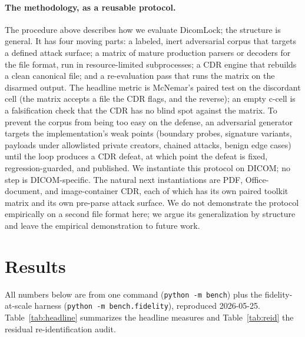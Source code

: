 \documentclass[11pt]{article}
\begin{document}
\paragraph{The methodology, as a reusable protocol.} The procedure above describes how we evaluate DicomLock; the structure is general. It has four moving parts: a labeled, inert adversarial corpus that targets a defined attack surface; a matrix of mature production parsers or decoders for the file format, run in resource-limited subprocesses; a CDR engine that rebuilds a clean canonical file; and a re-evaluation pass that runs the matrix on the disarmed output. The headline metric is McNemar's paired test on the discordant cell (the matrix accepts a file the CDR flags, and the reverse); an empty c-cell is a falsification check that the CDR has no blind spot against the matrix. To prevent the corpus from being too easy on the defense, an adversarial generator targets the implementation's weak points (boundary probes, signature variants, payloads under allowlisted private creators, chained attacks, benign edge cases) until the loop produces a CDR defeat, at which point the defeat is fixed, regression-guarded, and published. We instantiate this protocol on DICOM; no step is DICOM-specific. The natural next instantiations are PDF, Office-document, and image-container CDR, each of which has its own paired toolkit matrix and its own pre-parse attack surface. We do not demonstrate the protocol empirically on a second file format here; we argue its generalization by structure and leave the empirical demonstration to future work.

\section{Results}

All numbers below are from one command (\verb|python -m bench|) plus the fidelity-at-scale harness (\verb|python -m bench.fidelity|), reproduced 2026-05-25. Table~\ref{tab:headline} summarizes the headline measures and Table~\ref{tab:reid} the residual re-identification audit.
\end{document}
